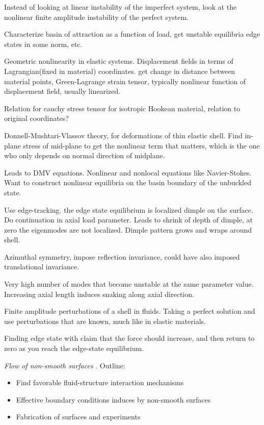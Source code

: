 \begin{description}
{\begin{description}
Instead of looking at linear instability of the imperfect system,
look at the nonlinear finite amplitude instability of the perfect system.

Characterize basin of attraction as a function of load, get unstable equilibria
edge states in some norm, etc.

Geometric nonlinearity in elastic systems.
Displacement fields in terms of Lagrangian(fixed in material) coordinates.
get change in distance between material points, Green-Lagrange strain tensor,
typically nonlinear function of displacement field, usually linearized.

Relation for cauchy stress tensor for isotropic Hookean material,
relation to original coordinates?

Donnell-Mushtari-Vlassov theory, for deformations of thin elastic shell.
Find in-plane stress of mid-plane to get the nonlinear term that matters,
which is the one who only depends on normal direction of midplane.

Leads to DMV equations. Nonlinear and nonlocal equations like Navier-Stokes.
Want to construct nonlinear equilibria on the basin boundary of the unbuckled state.

Use edge-tracking. the edge state equilibrium is localized dimple on the surface.
Do continuation in axial load parameter. Leads to shrink of depth of dimple,
at zero the eigenmodes are not localized. Dimple pattern grows and wraps around shell.

Azimuthal symmetry, impose reflection invariance, could have also imposed translational
invariance.

Very high number of modes that become unstable at the same parameter value. Increasing
axial length induces snaking along axial direction.

Finite amplitude perturbations of a shell in fluids. Taking a perfect solution and
use perturbations that are known, much like in elastic materials.

Finding edge state with claim that the force should increase, and then return to zero
as you reach the edge-state equilibrium.

\item[S. Bagheri Talk]
\textit{Flow of non-smooth surfaces}
.
Outline:
\begin{itemize}
\item Find favorable fluid-structure interaction mechanisms
\item Effective boundary conditions induces by non-smooth surfaces
\item Fabrication of surfaces and experiments
\end{itemize}


\end{description}}
\end{description}
